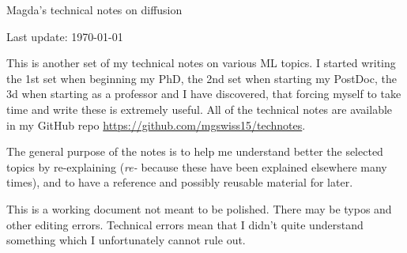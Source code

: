 \documentclass[a4paper, oneside, 10pt]{article}
\theoremstyle{plain}
\theoremstyle{mytheoremstyle}
\theoremstyle{definition}
\theoremstyle{mydefstyle}
\begin{document}
\graphicspath{ {./Pics/} }

\setlength{\parindent}{0pt}
\setlength{\parskip}{1ex plus 0.5ex minus 0.2ex}


{\large Magda's technical notes on diffusion}

{\hfill Last update: \today}

This is another set of my technical notes on various ML topics.
I started writing the 1st set when beginning my PhD, the 2nd set when starting my PostDoc, the 3d when starting as a professor and I have discovered, that forcing myself to take time and write these is extremely useful.
All of the technical notes are available in my GitHub repo \url{https://github.com/mgswiss15/technotes}.

The general purpose of the notes is to help me understand better the selected topics by re-explaining (\emph{re-} because these have been explained elsewhere many times), and to have a reference and possibly reusable material for later.

This is a working document not meant to be polished. There may be typos and other editing errors. 
Technical errors mean that I didn't quite understand something which I unfortunately cannot rule out.


\tableofcontents








\clearpage 
\printbibliography



\cleardoublepage
{}
\printindex
\end{document}
